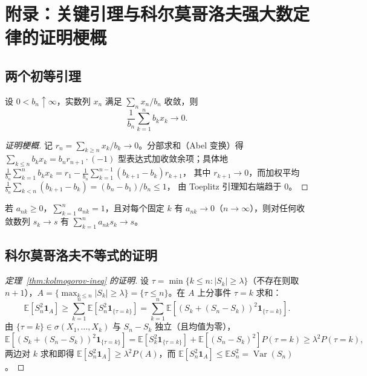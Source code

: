 \section{附录：关键引理与科尔莫哥洛夫强大数定律的证明梗概}\label{sec:appendix}

\subsection{两个初等引理}

\begin{lemma}[克罗内克尔引理]\label{lem:kronecker}
    设 $0 < b_n \uparrow \infty$，实数列 $x_n$ 满足 $\sum_n x_n / b_n$ 收敛，则
    \begin{equation}
        \frac{1}{b_n}\sum_{k=1}^n b_k x_k \to 0.
    \end{equation}
\end{lemma}

\begin{proof}[证明梗概]
    记 $r_n = \sum_{k \geq n} x_k / b_k \to 0$。分部求和（Abel 变换）得
    $\sum_{k \leq n} b_k x_k = b_n r_{n+1}\cdot(-1)$ 型表达式加收敛余项；具体地
    $\frac{1}{b_n}\sum_{k=1}^n b_k x_k = r_1 - \frac{1}{b_n}\sum_{k=1}^{n-1}(b_{k+1}-b_k) r_{k+1}$，
    其中 $r_{k+1} \to 0$，而加权平均 $\frac{1}{b_n}\sum_{k<n}(b_{k+1}-b_k) = (b_n - b_1)/b_n \leq 1$，
    由 Toeplitz 引理知右端趋于 $0$。
\end{proof}

\begin{lemma}[Toeplitz 引理]\label{lem:toeplitz}
    若 $a_{nk} \geq 0$，$\sum_{k=1}^{n} a_{nk} = 1$，且对每个固定 $k$ 有 $a_{nk} \to 0$（$n \to \infty$），则对任何收敛数列 $s_k \to s$ 有 $\sum_{k=1}^n a_{nk} s_k \to s$。
\end{lemma}

\subsection{科尔莫哥洛夫不等式的证明}

\begin{proof}[定理~\ref{thm:kolmogorov-ineq} 的证明]
    设 $\tau = \min\{k \leq n: |S_k| \geq \lambda\}$（不存在则取 $n+1$），$A = \{\max_{k \leq n} |S_k| \geq \lambda\} = \{\tau \leq n\}$。在 $A$ 上分事件 $\tau = k$ 求和：
    \begin{equation}
        \mathbb{E}\left[S_n^2 \mathbf{1}_A\right] \geq \sum_{k=1}^n \mathbb{E}\left[S_n^2 \mathbf{1}_{\{\tau = k\}}\right]
        = \sum_{k=1}^n \mathbb{E}\left[(S_k + (S_n - S_k))^2 \mathbf{1}_{\{\tau = k\}}\right].
    \end{equation}
    由 $\{\tau = k\} \in \sigma(X_1, \dots, X_k)$ 与 $S_n - S_k$ 独立（且均值为零），
    \begin{equation}
        \mathbb{E}\left[(S_k + (S_n - S_k))^2 \mathbf{1}_{\{\tau = k\}}\right]
        = \mathbb{E}\left[S_k^2 \mathbf{1}_{\{\tau = k\}}\right] + \mathbb{E}\left[(S_n - S_k)^2\right] P(\tau = k)
        \geq \lambda^2 P(\tau = k),
    \end{equation}
    两边对 $k$ 求和即得 $\mathbb{E}[S_n^2 \mathbf{1}_A] \geq \lambda^2 P(A)$，而 $\mathbb{E}[S_n^2 \mathbf{1}_A] \leq \mathbb{E}S_n^2 = \operatorname{Var}(S_n)$。
\end{proof}

